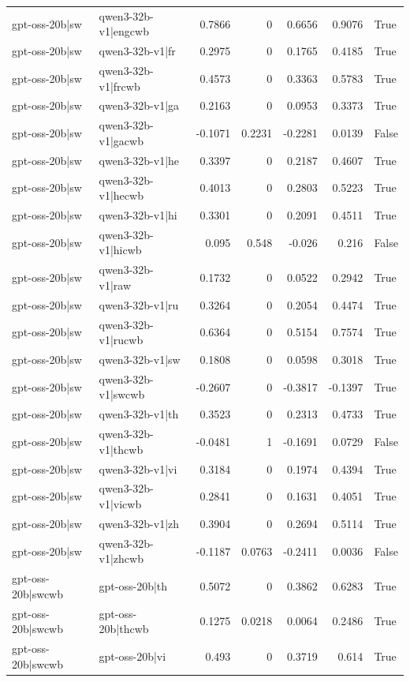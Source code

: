 \begin{table}
\begin{tabular}{l l r r r r l}
gpt-oss-20b|sw & qwen3-32b-v1|engcwb & 0.7866 & 0 & 0.6656 & 0.9076 & True \\
gpt-oss-20b|sw & qwen3-32b-v1|fr & 0.2975 & 0 & 0.1765 & 0.4185 & True \\
gpt-oss-20b|sw & qwen3-32b-v1|frcwb & 0.4573 & 0 & 0.3363 & 0.5783 & True \\
gpt-oss-20b|sw & qwen3-32b-v1|ga & 0.2163 & 0 & 0.0953 & 0.3373 & True \\
gpt-oss-20b|sw & qwen3-32b-v1|gacwb & -0.1071 & 0.2231 & -0.2281 & 0.0139 & False \\
gpt-oss-20b|sw & qwen3-32b-v1|he & 0.3397 & 0 & 0.2187 & 0.4607 & True \\
gpt-oss-20b|sw & qwen3-32b-v1|hecwb & 0.4013 & 0 & 0.2803 & 0.5223 & True \\
gpt-oss-20b|sw & qwen3-32b-v1|hi & 0.3301 & 0 & 0.2091 & 0.4511 & True \\
gpt-oss-20b|sw & qwen3-32b-v1|hicwb & 0.095 & 0.548 & -0.026 & 0.216 & False \\
gpt-oss-20b|sw & qwen3-32b-v1|raw & 0.1732 & 0 & 0.0522 & 0.2942 & True \\
gpt-oss-20b|sw & qwen3-32b-v1|ru & 0.3264 & 0 & 0.2054 & 0.4474 & True \\
gpt-oss-20b|sw & qwen3-32b-v1|rucwb & 0.6364 & 0 & 0.5154 & 0.7574 & True \\
gpt-oss-20b|sw & qwen3-32b-v1|sw & 0.1808 & 0 & 0.0598 & 0.3018 & True \\
gpt-oss-20b|sw & qwen3-32b-v1|swcwb & -0.2607 & 0 & -0.3817 & -0.1397 & True \\
gpt-oss-20b|sw & qwen3-32b-v1|th & 0.3523 & 0 & 0.2313 & 0.4733 & True \\
gpt-oss-20b|sw & qwen3-32b-v1|thcwb & -0.0481 & 1 & -0.1691 & 0.0729 & False \\
gpt-oss-20b|sw & qwen3-32b-v1|vi & 0.3184 & 0 & 0.1974 & 0.4394 & True \\
gpt-oss-20b|sw & qwen3-32b-v1|vicwb & 0.2841 & 0 & 0.1631 & 0.4051 & True \\
gpt-oss-20b|sw & qwen3-32b-v1|zh & 0.3904 & 0 & 0.2694 & 0.5114 & True \\
gpt-oss-20b|sw & qwen3-32b-v1|zhcwb & -0.1187 & 0.0763 & -0.2411 & 0.0036 & False \\
gpt-oss-20b|swcwb & gpt-oss-20b|th & 0.5072 & 0 & 0.3862 & 0.6283 & True \\
gpt-oss-20b|swcwb & gpt-oss-20b|thcwb & 0.1275 & 0.0218 & 0.0064 & 0.2486 & True \\
gpt-oss-20b|swcwb & gpt-oss-20b|vi & 0.493 & 0 & 0.3719 & 0.614 & True \\

\end{tabular}
\end{table}
